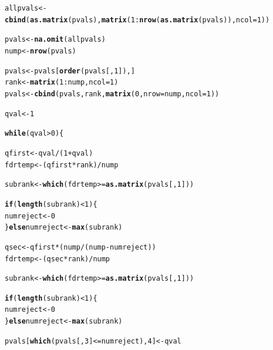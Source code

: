 \documentclass[11pt, a4paper]{article}\usepackage[]{graphicx}\usepackage[]{color}
\makeatletter
\newcommand{\hlnum}[1]{\textcolor[rgb]{0.686,0.059,0.569}{#1}}%
\newcommand{\hlopt}[1]{\textcolor[rgb]{0,0,0}{#1}}%
\newcommand{\hlstd}[1]{\textcolor[rgb]{0.345,0.345,0.345}{#1}}%
\newcommand{\hlkwa}[1]{\textcolor[rgb]{0.161,0.373,0.58}{\textbf{#1}}}%
\newcommand{\hlkwb}[1]{\textcolor[rgb]{0.69,0.353,0.396}{#1}}%
\newcommand{\hlkwc}[1]{\textcolor[rgb]{0.333,0.667,0.333}{#1}}%
\newcommand{\hlkwd}[1]{\textcolor[rgb]{0.737,0.353,0.396}{\textbf{#1}}}%
\newenvironment{kframe}{%
 \def\at@end@of@kframe{}%
 \ifinner\ifhmode%
  \def\at@end@of@kframe{\end{minipage}}%
  \begin{minipage}{\columnwidth}%
 \fi\fi%
 \def\FrameCommand##1{\hskip\@totalleftmargin \hskip-\fboxsep
 \colorbox{shadecolor}{##1}\hskip-\fboxsep
     \hskip-\linewidth \hskip-\@totalleftmargin \hskip\columnwidth}%
 \MakeFramed {\advance\hsize-\width
   \@totalleftmargin\z@ \linewidth\hsize
   \@setminipage}}%
 {\par\unskip\endMakeFramed%
 \at@end@of@kframe}
\newenvironment{knitrout}{}{} %
\makeatother
\begin{document}
\begin{footnotesize}
\begin{knitrout}
\begin{kframe}
\begin{alltt}
        \hlstd{allpvals} \hlkwb{<-} \hlkwd{cbind}\hlstd{(}\hlkwd{as.matrix}\hlstd{(pvals),} \hlkwd{matrix}\hlstd{(}\hlnum{1}\hlopt{:}\hlkwd{nrow}\hlstd{(}\hlkwd{as.matrix}\hlstd{(pvals)),} \hlkwc{ncol} \hlstd{=} \hlnum{1}\hlstd{))}

        \hlstd{pvals} \hlkwb{<-} \hlkwd{na.omit}\hlstd{(allpvals)}
        \hlstd{nump} \hlkwb{<-} \hlkwd{nrow}\hlstd{(pvals)}

        \hlstd{pvals} \hlkwb{<-} \hlstd{pvals[}\hlkwd{order}\hlstd{(pvals[,} \hlnum{1}\hlstd{]), ]}
        \hlstd{rank} \hlkwb{<-} \hlkwd{matrix}\hlstd{(}\hlnum{1}\hlopt{:}\hlstd{nump,} \hlkwc{ncol} \hlstd{=} \hlnum{1}\hlstd{)}
        \hlstd{pvals} \hlkwb{<-} \hlkwd{cbind}\hlstd{(pvals, rank,} \hlkwd{matrix}\hlstd{(}\hlnum{0}\hlstd{,} \hlkwc{nrow} \hlstd{= nump,} \hlkwc{ncol} \hlstd{=} \hlnum{1}\hlstd{))}

        \hlstd{qval} \hlkwb{<-} \hlnum{1}

        \hlkwa{while} \hlstd{(qval} \hlopt{>} \hlnum{0}\hlstd{) \{}

            \hlstd{qfirst} \hlkwb{<-} \hlstd{qval} \hlopt{/} \hlstd{(}\hlnum{1} \hlopt{+} \hlstd{qval)}
            \hlstd{fdrtemp} \hlkwb{<-} \hlstd{(qfirst} \hlopt{*} \hlstd{rank)} \hlopt{/} \hlstd{nump}

            \hlstd{subrank} \hlkwb{<-} \hlkwd{which}\hlstd{(fdrtemp} \hlopt{>=} \hlkwd{as.matrix}\hlstd{(pvals[,} \hlnum{1}\hlstd{]))}

            \hlkwa{if} \hlstd{(}\hlkwd{length}\hlstd{(subrank)} \hlopt{<} \hlnum{1}\hlstd{) \{}
                \hlstd{numreject} \hlkwb{<-} \hlnum{0}
            \hlstd{\}} \hlkwa{else} \hlstd{numreject} \hlkwb{<-} \hlkwd{max}\hlstd{(subrank)}

            \hlstd{qsec} \hlkwb{<-} \hlstd{qfirst} \hlopt{*} \hlstd{(nump} \hlopt{/} \hlstd{(nump} \hlopt{-} \hlstd{numreject))}
            \hlstd{fdrtemp} \hlkwb{<-} \hlstd{(qsec} \hlopt{*} \hlstd{rank)} \hlopt{/} \hlstd{nump}

            \hlstd{subrank} \hlkwb{<-} \hlkwd{which}\hlstd{(fdrtemp} \hlopt{>=} \hlkwd{as.matrix}\hlstd{(pvals[,} \hlnum{1}\hlstd{]))}

            \hlkwa{if} \hlstd{(}\hlkwd{length}\hlstd{(subrank)} \hlopt{<} \hlnum{1}\hlstd{) \{}
                \hlstd{numreject} \hlkwb{<-} \hlnum{0}
            \hlstd{\}} \hlkwa{else} \hlstd{numreject} \hlkwb{<-} \hlkwd{max}\hlstd{(subrank)}

            \hlstd{pvals[}\hlkwd{which}\hlstd{(pvals[,} \hlnum{3}\hlstd{]} \hlopt{<=} \hlstd{numreject),} \hlnum{4}\hlstd{]} \hlkwb{<-} \hlstd{qval}


\end{alltt}
\end{kframe}
\end{knitrout}
\end{footnotesize}
\end{document}
